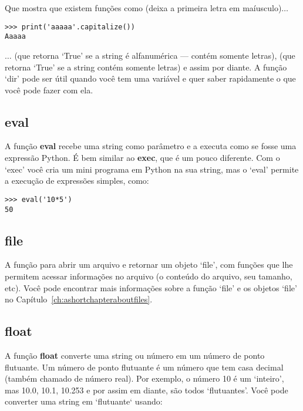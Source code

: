 Que mostra que existem funções como  (deixa a primeira letra em maíusculo)$\ldots$

\begin{listing}
\begin{verbatim}
>>> print('aaaaa'.capitalize())
Aaaaa
\end{verbatim}
\end{listing}

$\ldots$ (que retorna `True' se a string é alfanumérica --- contém somente letras),  (que retorna `True' se a string contém somente letras) e assim por diante. A função `dir' pode ser útil quando você tem uma variável e quer saber rapidamente o que você pode fazer com ela.

\subsection*{eval}

A função \textbf{eval} recebe uma string como parâmetro e a executa como se fosse uma expressão Python. É bem similar ao \textbf{exec}, que é um pouco diferente. Com o `exec' você cria um mini programa em Python na sua string, mas o `eval' permite a execução de expressões simples, como:

\begin{listing}
\begin{verbatim}
>>> eval('10*5')
50
\end{verbatim}
\end{listing}

\subsection*{file}

A função para abrir um arquivo e retornar um objeto `file', com funções que lhe permitem acessar informações no arquivo (o conteúdo do arquivo, seu tamanho, etc). Você pode encontrar mais informações sobre a função `file' e os objetos `file' no Capítulo~\ref{ch:ashortchapteraboutfiles}.

\subsection*{float}

A função \textbf{float} converte uma string ou número em um número de ponto flutuante. Um número de ponto flutuante é um número que tem casa decimal (também chamado de número real). Por exemplo, o número 10 é um `inteiro', mas 10.0, 10.1, 10.253 e por assim em diante, são todos `flutuantes'. Você pode converter uma string em `flutuante` usando:

